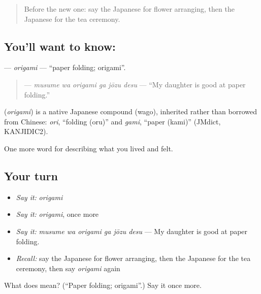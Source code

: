 \begin{quote}
Before the new one: say the Japanese for flower arranging, then the Japanese for the tea ceremony.
\end{quote}

\subsection*{You'll want to know: }
\textbf{} — \emph{origami} — \textquotedblleft{}paper folding; origami\textquotedblright{}.

\begin{quote}
\textbf{  } — \emph{musume wa origami ga jōzu desu} — \textquotedblleft{}My daughter is good at paper folding.\textquotedblright{}
\end{quote}

\begin{cousinweb}
\textbf{} (\emph{origami}) is a native Japanese compound (wago), inherited rather than borrowed from Chinese: \emph{ori}, \textquotedblleft{}folding (oru)\textquotedblright{} and \emph{gami}, \textquotedblleft{}paper (kami)\textquotedblright{} (JMdict, KANJIDIC2).
\end{cousinweb}

\begin{grammarlens}[title={What you've built}]
One more word for describing what you lived and felt.
\end{grammarlens}

\subsection*{Your turn}
\begin{itemize}
\raggedright
  \item \emph{Say it:} \emph{origami}
  \item \emph{Say it:} \emph{origami}, once more
  \item \emph{Say it:} \emph{musume wa origami ga jōzu desu} — My daughter is good at paper folding.
  \item \emph{Recall:} say the Japanese for flower arranging, then the Japanese for the tea ceremony, then say \emph{origami} again
\end{itemize}

\begin{tcolorbox}[breakable,colback=teal!4,colframe=teal!35!black,title={Before you move on}]
What does  mean? (\textquotedblleft{}Paper folding; origami\textquotedblright{}.) Say it once more.
\end{tcolorbox}
